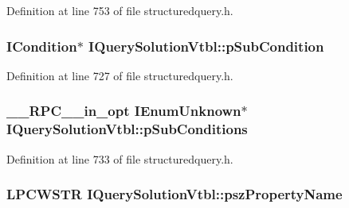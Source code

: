 Definition at line 753 of file structuredquery.\+h.

\subsubsection[{\texorpdfstring{p\+Sub\+Condition}{pSubCondition}}]{ {\bf I\+Condition}$\ast$ I\+Query\+Solution\+Vtbl\+::p\+Sub\+Condition}\hypertarget{struct_i_query_solution_vtbl_ae4602e4ad5aefeae2a8a1b29cd076a11}{}\label{struct_i_query_solution_vtbl_ae4602e4ad5aefeae2a8a1b29cd076a11}


Definition at line 727 of file structuredquery.\+h.

\subsubsection[{\texorpdfstring{p\+Sub\+Conditions}{pSubConditions}}]{ {\bf \+\_\+\+\_\+\+R\+P\+C\+\_\+\+\_\+in\+\_\+opt} I\+Enum\+Unknown$\ast$ I\+Query\+Solution\+Vtbl\+::p\+Sub\+Conditions}\hypertarget{struct_i_query_solution_vtbl_a5a57441c383c582c3b9e3d57b32d9806}{}\label{struct_i_query_solution_vtbl_a5a57441c383c582c3b9e3d57b32d9806}


Definition at line 733 of file structuredquery.\+h.

\subsubsection[{\texorpdfstring{psz\+Property\+Name}{pszPropertyName}}]{ {\bf L\+P\+C\+W\+S\+TR} I\+Query\+Solution\+Vtbl\+::psz\+Property\+Name}\hypertarget{struct_i_query_solution_vtbl_ad65d4e8f1c2c56722e5429ef296f94fa}{}\label{struct_i_query_solution_vtbl_ad65d4e8f1c2c56722e5429ef296f94fa}


